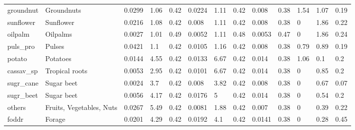 \documentclass[gc, manuscript]{copernicus}
\begin{document}
\begin{table}
\begin{tabular}{lllllllllllll}
groundnut  & Groundnuts                      & 0.0299      & 1.06       & 0.42      & 0.0224        & 1.11         & 0.42       & 0.008                & 0.38               & 1.54                     & 1.07                     & 0.19 \\
sunflower  & Sunflower                       & 0.0216      & 1.08       & 0.42      & 0.008         & 1.11         & 0.42       & 0.008                & 0.38               & 0                        & 1.86                     & 0.22 \\
oilpalm    & Oilpalms                        & 0.0027      & 1.01       & 0.49      & 0.0052        & 1.11         & 0.48       & 0.0053               & 0.47               & 0                        & 1.86                     & 0.24 \\
puls\_pro  & Pulses                          & 0.0421      & 1.1        & 0.42      & 0.0105        & 1.16         & 0.42       & 0.008                & 0.38               & 0.79                     & 0.89                     & 0.19 \\
potato     & Potatoes                        & 0.0144      & 4.55       & 0.42      & 0.0133        & 6.67         & 0.42       & 0.014                & 0.38               & 1.06                     & 0.1                      & 0.2  \\
cassav\_sp & Tropical roots                  & 0.0053      & 2.95       & 0.42      & 0.0101        & 6.67         & 0.42       & 0.014                & 0.38               & 0                        & 0.85                     & 0.2  \\
sugr\_cane & Sugar beet                      & 0.0024      & 3.7        & 0.42      & 0.008         & 3.82         & 0.42       & 0.008                & 0.38               & 0                        & 0.67                     & 0.07 \\
sugr\_beet & Sugar beet                      & 0.0056      & 4.17       & 0.42      & 0.0176        & 5            & 0.42       & 0.014                & 0.38               & 0                        & 0.54                     & 0.2  \\
others     & Fruits, Vegetables, Nuts          & 0.0267      & 5.49       & 0.42      & 0.0081        & 1.88         & 0.42       & 0.007                & 0.38               & 0                        & 0.39                     & 0.22 \\
foddr      & Forage                          & 0.0201      & 4.29       & 0.42      & 0.0192        & 4.1          & 0.42       & 0.0141               & 0.38               & 0                        & 0.28                     & 0.45 \\

\end{tabular}
\end{table}
\end{document}

